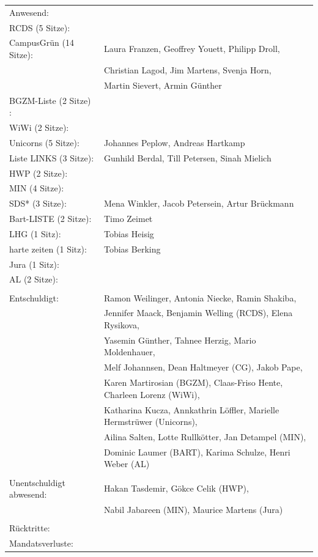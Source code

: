 \documentclass[ngerman,headheight=70pt]{scrartcl}
\begin{document}
    \begin{tabular}{ll}
        Anwesend: & \\
            RCDS (5 Sitze): &  \\
             CampusGrün (14 Sitze): & Laura Franzen, Geoffrey Youett, Philipp Droll, \\
                                   & Christian Lagod, Jim Martens, Svenja Horn, \\
                                   & Martin Sievert, Armin Günther \\
             BGZM-Liste (2 Sitze) : & \\
             WiWi (2 Sitze): & \\
             Unicorns (5 Sitze): &  Johannes Peplow, Andreas Hartkamp \\
             Liste LINKS (3 Sitze): & Gunhild Berdal, Till Petersen, Sinah Mielich \\
             HWP (2 Sitze): &  \\
             MIN (4 Sitze): &  \\
             SDS* (3 Sitze): & Mena Winkler, Jacob Petersein, Artur Brückmann \\
             Bart-LISTE (2 Sitze): & Timo Zeimet \\
             LHG (1 Sitz): & Tobias Heisig \\
             harte zeiten (1 Sitz): & Tobias Berking \\
             Jura (1 Sitz): & \\
             AL (2 Sitze): &  \\
            & \\
        Entschuldigt: & Ramon Weilinger, Antonia Niecke, Ramin Shakiba, \\
                      & Jennifer Maack, Benjamin Welling (RCDS), Elena Rysikova, \\
                      & Yasemin Günther, Tahnee Herzig, Mario Moldenhauer, \\
                      & Melf Johannsen, Dean Haltmeyer (CG), Jakob Pape, \\
                      & Karen Martirosian (BGZM), Claas-Friso Hente, Charleen Lorenz (WiWi), \\
                      & Katharina Kucza, Annkathrin Löffler, Marielle Hermstrüwer (Unicorns),\\
                      & Ailina Salten, Lotte Rullkötter, Jan Detampel (MIN), \\
                      & Dominic Laumer (BART), Karima Schulze, Henri Weber (AL)\\
                      &\\
        Unentschuldigt abwesend: & Hakan Tasdemir, Gökce Celik (HWP),\\
                                & Nabil Jabareen (MIN), Maurice Martens (Jura) \\
                                &\\
        Rücktritte: & \\
        Mandatsverluste: & \\
    \end{tabular}
\end{document}
